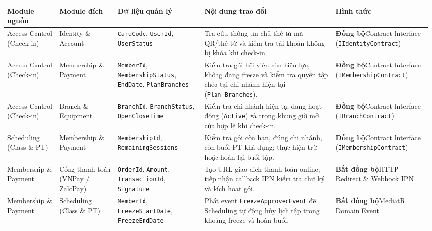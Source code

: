 \documentclass[a4paper,12pt]{article}
\begin{document}
\begin{table}[H]
\centering
\footnotesize
\begin{tabularx}{\textwidth}{|L{2.5cm}|L{2.5cm}|L{2.8cm}|Y|L{2.8cm}|}
\hline
\textbf{Module nguồn} & \textbf{Module đích} & \textbf{Dữ liệu quản lý} & \textbf{Nội dung trao đổi} & \textbf{Hình thức} \\ \hline
Access Control (Check-in) & Identity \& Account & \texttt{CardCode}, \texttt{UserId}, \texttt{UserStatus} & Tra cứu thông tin chủ thẻ từ mã QR/thẻ từ và kiểm tra tài khoản không bị khóa khi check-in. & \textbf{Đồng bộ}\newline Contract Interface (\texttt{IIdentityContract}) \\ \hline
Access Control (Check-in) & Membership \& Payment & \texttt{MemberId}, \texttt{MembershipStatus}, \texttt{EndDate}, \texttt{PlanBranches} & Kiểm tra gói hội viên còn hiệu lực, không đang freeze và kiểm tra quyền tập chéo tại chi nhánh hiện tại (\texttt{Plan\_Branches}). & \textbf{Đồng bộ}\newline Contract Interface (\texttt{IMembershipContract}) \\ \hline
Access Control (Check-in) & Branch \& Equipment & \texttt{BranchId}, \texttt{BranchStatus}, \texttt{OpenCloseTime} & Kiểm tra chi nhánh hiện tại đang hoạt động (\texttt{Active}) và trong khung giờ mở cửa hợp lệ khi check-in. & \textbf{Đồng bộ}\newline Contract Interface (\texttt{IBranchContract}) \\ \hline
Scheduling (Class \& PT) & Membership \& Payment & \texttt{MembershipId}, \texttt{RemainingSessions} & Kiểm tra gói còn hạn, đúng chi nhánh, còn buổi PT khả dụng; thực hiện trừ hoặc hoàn lại buổi tập. & \textbf{Đồng bộ}\newline Contract Interface (\texttt{IMembershipContract}) \\ \hline
Membership \& Payment & Cổng thanh toán (VNPay / ZaloPay) & \texttt{OrderId}, \texttt{Amount}, \texttt{TransactionId}, \texttt{Signature} & Tạo URL giao dịch thanh toán online; tiếp nhận callback IPN kiểm tra chữ ký và kích hoạt gói. & \textbf{Bất đồng bộ}\newline HTTP Redirect \& Webhook IPN \\ \hline
Membership \& Payment & Scheduling (Class \& PT) & \texttt{MemberId}, \texttt{FreezeStartDate}, \texttt{FreezeEndDate} & Phát event \texttt{FreezeApprovedEvent} để Scheduling tự động hủy lịch tập trong khoảng freeze và hoàn buổi. & \textbf{Bất đồng bộ}\newline MediatR Domain Event \\ \hline

\end{tabularx}
\end{table}
\end{document}
